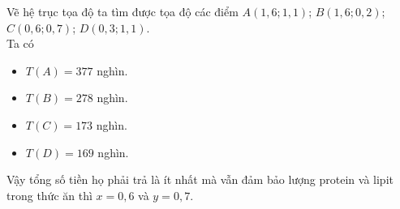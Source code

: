 \begin{bt}
{\begin{center}
		\end{center}
		Vẽ hệ trục tọa độ ta tìm được tọa độ các điểm $A(1{,}6; 1{,}1)$; $B(1{,}6; 0{,}2)$; $C(0{,}6; 0{,}7)$;  $D(0{,}3; 1{,}1)$.\\
		Ta có 
		\begin{itemize}
			\item $T(A)=377$ nghìn. 
			 \item $T(B)=278$ nghìn.
			\item $T(C)=173$  nghìn.
			\item $T(D)=169$ nghìn. 
		\end{itemize}
		Vậy tổng số tiền họ phải trả là ít nhất mà vẫn đảm bảo lượng protein và lipit trong thức ăn thì $x=0{,}6$ và  $y=0{,}7$.
	 }
\end{bt}

